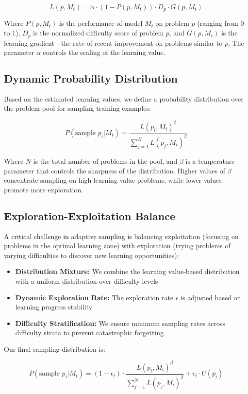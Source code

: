 $$L(p, M_t) = \alpha \cdot (1 - P(p, M_t)) \cdot D_p \cdot G(p, M_t)$$

Where $P(p, M_t)$ is the performance of model $M_t$ on problem $p$ (ranging from 0 to 1), $D_p$ is the normalized difficulty score of problem $p$, and $G(p, M_t)$ is the learning gradient—the rate of recent improvement on problems similar to $p$. The parameter $\alpha$ controls the scaling of the learning value.

\subsection{Dynamic Probability Distribution}

Based on the estimated learning values, we define a probability distribution over the problem pool for sampling training examples:

$$P(\text{sample } p_i | M_t) = \frac{L(p_i, M_t)^\beta}{\sum_{j=1}^{N} L(p_j, M_t)^\beta}$$

Where $N$ is the total number of problems in the pool, and $\beta$ is a temperature parameter that controls the sharpness of the distribution. Higher values of $\beta$ concentrate sampling on high learning value problems, while lower values promote more exploration.

\subsection{Exploration-Exploitation Balance}

A critical challenge in adaptive sampling is balancing exploitation (focusing on problems in the optimal learning zone) with exploration (trying problems of varying difficulties to discover new learning opportunities):

\begin{itemize}
    \item \textbf{Distribution Mixture:} We combine the learning value-based distribution with a uniform distribution over difficulty levels
    \item \textbf{Dynamic Exploration Rate:} The exploration rate $\epsilon$ is adjusted based on learning progress stability
    \item \textbf{Difficulty Stratification:} We ensure minimum sampling rates across difficulty strata to prevent catastrophic forgetting
\end{itemize}

Our final sampling distribution is:

$$P(\text{sample } p_i | M_t) = (1 - \epsilon_t) \cdot \frac{L(p_i, M_t)^\beta}{\sum_{j=1}^{N} L(p_j, M_t)^\beta} + \epsilon_t \cdot U(p_i)$$

